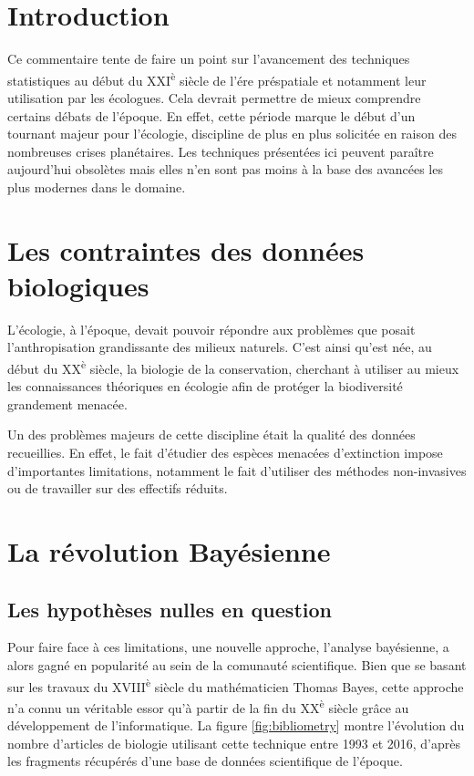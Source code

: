\maketitle

\section{Introduction}

Ce commentaire tente de faire un point sur l'avancement des techniques
statistiques au début du XXI\textsuperscript{è} siècle de l'ére préspatiale et
notamment leur utilisation par les écologues.
Cela devrait permettre de mieux comprendre certains débats de l'époque.
En effet, cette période marque le début d'un tournant majeur pour l'écologie,
discipline de plus en plus solicitée en raison des nombreuses crises
planétaires.
Les techniques présentées ici peuvent paraître aujourd'hui obsolètes mais elles
n'en sont pas moins à la base des avancées les plus modernes dans le domaine.


\section{Les contraintes des données biologiques}

L'écologie, à l'époque, devait pouvoir répondre aux problèmes que posait
l'anthropisation grandissante des milieux naturels.
C'est ainsi qu'est née, au début du XX\textsuperscript{è} siècle, la biologie de
la conservation, cherchant à utiliser au mieux les connaissances théoriques en
écologie afin de protéger la biodiversité grandement menacée.

Un des problèmes majeurs de cette discipline était la qualité des données
recueillies.
En effet, le fait d'étudier des espèces menacées d'extinction impose
d'importantes limitations, notamment le fait d'utiliser des méthodes
non-invasives ou de travailler sur des effectifs réduits.


\section{La révolution Bayésienne}
\subsection{Les hypothèses nulles en question}

Pour faire face à ces limitations, une nouvelle approche, l'analyse bayésienne,
a alors gagné en popularité au sein de la comunauté scientifique.
Bien que se basant sur les travaux du XVIII\textsuperscript{è} siècle du
mathématicien Thomas Bayes, cette approche n'a connu un véritable essor qu'à
partir de la fin du XX\textsuperscript{è} siècle grâce au développement de
l'informatique.
La figure \ref{fig:bibliometry} montre l'évolution du nombre d'articles de
biologie utilisant cette technique entre 1993 et 2016, d'après les fragments
récupérés d'une base de données scientifique de l'époque.

